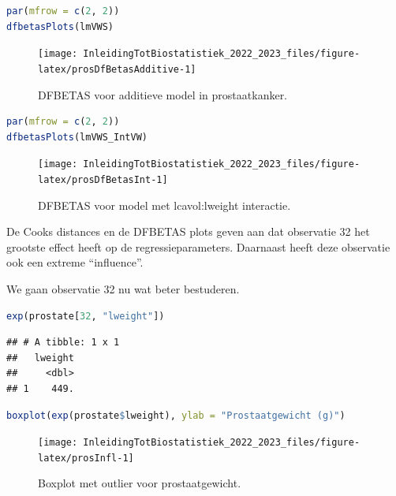 \documentclass[
  12pt,dutch,coursenotes]{book}
\begin{document}
\begin{lstlisting}[language=R]
par(mfrow = c(2, 2))
dfbetasPlots(lmVWS)
\end{lstlisting}

\begin{figure}

{\centering \texttt{[image: InleidingTotBiostatistiek\_2022\_2023\_files/figure-latex/prosDfBetasAdditive-1]} 

}

\caption{DFBETAS voor additieve model in prostaatkanker.}\label{fig:prosDfBetasAdditive}
\end{figure}

\begin{lstlisting}[language=R]
par(mfrow = c(2, 2))
dfbetasPlots(lmVWS_IntVW)
\end{lstlisting}

\begin{figure}

{\centering \texttt{[image: InleidingTotBiostatistiek\_2022\_2023\_files/figure-latex/prosDfBetasInt-1]} 

}

\caption{DFBETAS voor model met lcavol:lweight interactie.}\label{fig:prosDfBetasInt}
\end{figure}

De Cooks distances en de DFBETAS plots geven aan dat observatie 32 het grootste effect heeft op de regressieparameters. Daarnaast heeft deze observatie ook een extreme ``influence''.

We gaan observatie 32 nu wat beter bestuderen.

\begin{lstlisting}[language=R]
exp(prostate[32, "lweight"])
\end{lstlisting}

\begin{lstlisting}
## # A tibble: 1 x 1
##   lweight
##     <dbl>
## 1    449.
\end{lstlisting}

\begin{lstlisting}[language=R]
boxplot(exp(prostate$lweight), ylab = "Prostaatgewicht (g)")
\end{lstlisting}

\begin{figure}

{\centering \texttt{[image: InleidingTotBiostatistiek\_2022\_2023\_files/figure-latex/prosInfl-1]} 

}

\caption{Boxplot met outlier voor prostaatgewicht.}\label{fig:prosInfl}
\end{figure}
\end{document}
